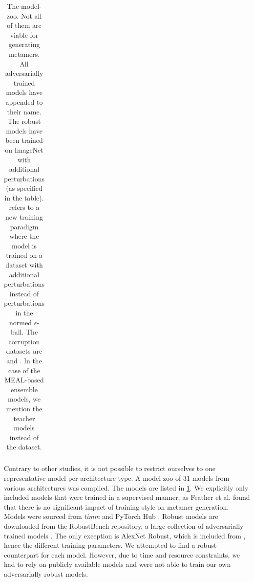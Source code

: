 \documentclass[pdflatex,sn-mathphys-num]{sn-jnl}%
\theoremstyle{thmstyleone}%
\theoremstyle{thmstyletwo}%
\theoremstyle{thmstylethree}%
\begin{document}
\begin{appendices}
\begin{table}
\begin{tabular}{|l|l|l|}
        \end{tabular}
        \caption[The model-zoo. Not all of them are viable for generating metamers.]{
            The model-zoo. Not all of them are viable for generating metamers.
            All adversarially trained models have  appended to their name.
            The robust models have been trained on ImageNet with additional perturbations (as specified in the table).
             refers to a new training paradigm where the model is trained on a dataset with additional perturbations instead of perturbations in the normed $\epsilon$-ball.
            The corruption datasets are  and  \cite{croce_robustbench_2021}.
            In the case of the MEAL-based ensemble models, we mention the teacher models instead of the dataset.
        }
        \label{tab:model-zoo}
    \end{table}


    Contrary to other studies, it is not possible to restrict ourselves to one representative model per architecture type.
    A model zoo of 31 models from various architectures was compiled.
    The models are listed in \cref{tab:model-zoo}.
    We explicitly only included models that were trained in a supervised manner,
    as Feather et al. \cite{feather_model_2023} found that there is no significant impact of training style on metamer generation.
    Models were sourced from \emph{timm} \cite{wightman_pytorch_2019} and PyTorch Hub \cite{paszke_pytorch_2019}.
    Robust models are downloaded from the RobustBench repository, a large collection of adversarially trained models \cite{croce_robustbench_2021}.
    The only exception is AlexNet Robust, which is included from \cite{feather_model_2023}, hence the different training parameters.
    We attempted to find a robust counterpart for each model.
    However, due to time and resource constraints, we had to rely on publicly available models and were not able to train our own adversarially robust models.


\end{appendices}
\end{document}
